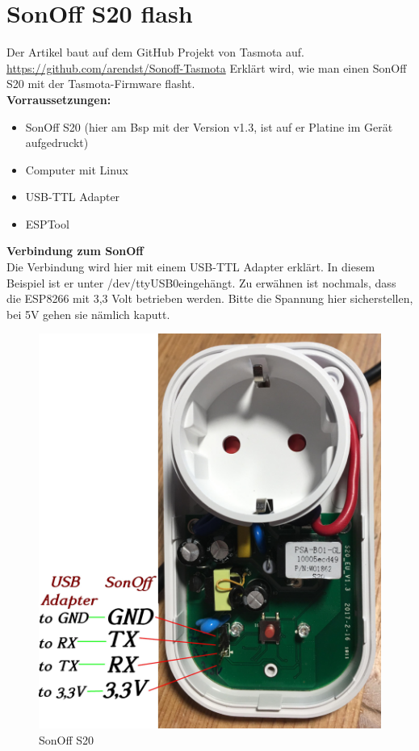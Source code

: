 \documentclass[11pt,fleqn]{book} %
\numberwithin{equation}{section} %
\numberwithin{figure}{section} %
\numberwithin{table}{section} %
\begin{document}
\section{SonOff S20 flash}
Der Artikel baut auf dem GitHub Projekt von Tasmota auf. \url{https://github.com/arendst/Sonoff-Tasmota} Erklärt wird, wie man einen SonOff S20 mit der Tasmota-Firmware flasht.\\
\textbf{Vorraussetzungen:}
\begin{itemize}
 \item SonOff S20 (hier am Bsp mit der Version v1.3, ist auf er Platine im Gerät aufgedruckt)
 \item Computer mit Linux
 \item USB-TTL Adapter
 \item ESPTool
\end{itemize}
\textbf{Verbindung zum SonOff}\\
Die Verbindung wird hier mit einem USB-TTL Adapter erklärt. In diesem Beispiel ist er unter \glqq /dev/ttyUSB0\grqq eingehängt. Zu erwähnen ist nochmals, dass die ESP8266 mit 3,3 Volt betrieben werden. Bitte die Spannung hier sicherstellen, bei 5V gehen sie nämlich kaputt. 
\begin{figure}[!h]%
\centering
    \includegraphics[scale=0.06]{Pictures/sonoff_s20.JPG}
  \caption{SonOff S20\label{pic:sonoff-s20-connect} }
\end{figure}
\end{document}
